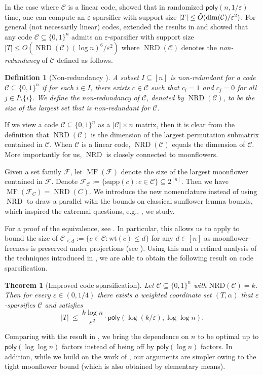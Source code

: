 \documentclass{article}
\newtheorem{theorem}{Theorem}[section]
\newtheorem{definition}[definition]{Definition}
\DeclareMathOperator{\NRD}{NRD}
\DeclareMathOperator{\MF}{MF}
\newcommand{\poly}{\mathsf{poly}}
\newcommand{\<}{\langle}
\renewcommand{\>}{\rangle}
\newcommand{\calC}{\mathcal{C}}
\newcommand{\calF}{\mathcal{F}}
\newcommand{\supp}{\mathrm{supp}}
\begin{document}
In the case where $\calC$ is a linear code, \cite{KPS24, KPS25} showed that in randomized $\poly (n, 1/\varepsilon)$ time, one can compute an $\varepsilon$-sparsifier with support size $|T| \leq \Tilde{O}(\dim (\calC) / \varepsilon^2)$. For general (not necessarily linear) codes, \cite{BG25} extended the results in \cite{KPS24, KPS25} and showed that any code $\calC \subseteq \{0, 1\}^n$ admits an $\varepsilon$-sparsifier with support size $|T| \leq O(\NRD (\calC) (\log n)^6 / \varepsilon^2)$ where $\NRD (\calC)$ denotes the \emph{non-redundancy} of $\calC$ defined as follows.

\begin{definition}[Non-redundancy \cite{BG25}]
    A subset $I \subseteq [n]$ is \emph{non-redundant} for a code $\calC \subseteq \{0, 1\}^n$ if for each $i \in I$, there exists $c \in \calC$ such that $c_i=1$ and $c_j=0$ for all $j \in I \setminus \{i\}$.
    We define the \emph{non-redundancy} of $\calC$, denoted by $\NRD(\calC)$, to be the size of the largest set that is non-redundant for $\calC$.
\end{definition}
If we view a code $\calC \subseteq \{0, 1\}^n$ as a $|\calC| \times n$ matrix, then it is clear from the definition that $\NRD(\calC)$ is the dimension of the largest permutation submatrix contained in $\calC$. When $\calC$ is a linear code, $\NRD(\calC)$ equals the dimension of $\calC$. More importantly for us, $\NRD$ is closely connected to moonflowers.

Given a set family $\calF$, let $\MF (\calF)$ denote the size of the largest moonflower contained in $\calF$. Denote $\calF_{\calC} := \{\supp (c): c \in \calC\} \subseteq 2^{[n]}$. Then we have $\MF (\calF_C) = \NRD (C)$. We introduce the new nomenclature instead of using $\NRD$ to draw a parallel with the bounds on classical sunflower lemma bounds, which inspired the extremal questions, e.g., , we study. 


For a proof of the equivalence, see . In particular, this allows us to apply  to bound the size of $\calC_{\leq d}:= \{c \in \calC: \mathrm{wt}(c) \leq d\}$  for any $d \in [n]$ as moonflower-freeness is preserved under projections (see ). Using this and a refined analysis of the techniques introduced in \cite{BG25}, we are able to obtain the following result on code sparsification.

\begin{theorem}[Improved code sparsification]\label{main:code_sparsification}
Let $\calC\subseteq\{0,1\}^n$ with $\mathrm{NRD}(\calC) = k$. 
Then for every $\varepsilon\in(0,1/4)$ there exists a weighted coordinate set $(T,\alpha)$
that $\varepsilon$-sparsifies $\calC$ and satisfies
\[
|T|
\ \le\
\frac{k\log n}{\varepsilon^2}\cdot \poly\!\left(\log(k/\varepsilon),\log\log n\right).
\]
\end{theorem}
Comparing with the result in \cite{BG25}, we bring the dependence on $n$ to be optimal up to $\poly(\log \log n)$ factors instead of being off by $\poly(\log n)$ factors. In addition, while we build on the work of \cite{BG25}, our arguments are simpler owing to the tight moonflower bound (which is also obtained by elementary means). 
\end{document}
